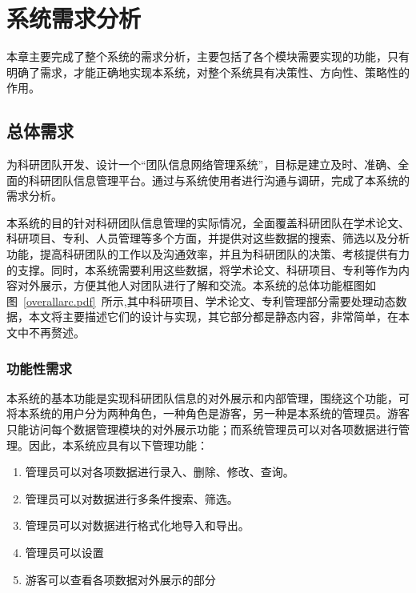 \chapter{系统需求分析}

本章主要完成了整个系统的需求分析，主要包括了各个模块需要实现的功能，只有明确了需求，才能正确地实现本系统，对整个系统具有决策性、方向性、策略性的作用。

\section{总体需求}
为科研团队开发、设计一个“团队信息网络管理系统”，目标是建立及时、准确、全面的科研团队信息管理平台。通过与系统使用者进行沟通与调研，完成了本系统的需求分析。

本系统的目的针对科研团队信息管理的实际情况，全面覆盖科研团队在学术论文、科研项目、专利、人员管理等多个方面，并提供对这些数据的搜索、筛选以及分析功能，提高科研团队的工作以及沟通效率，并且为科研团队的决策、考核提供有力的支撑。同时，本系统需要利用这些数据，将学术论文、科研项目、专利等作为内容对外展示，方便其他人对团队进行了解和交流。本系统的总体功能框图如图~\ref{overallarc.pdf}~所示,其中科研项目、学术论文、专利管理部分需要处理动态数据，本文将主要描述它们的设计与实现，其它部分都是静态内容，非常简单，在本文中不再赘述。


\subsection{功能性需求}

本系统的基本功能是实现科研团队信息的对外展示和内部管理，围绕这个功能，可将本系统的用户分为两种角色，一种角色是游客，另一种是本系统的管理员。游客只能访问每个数据管理模块的对外展示功能；而系统管理员可以对各项数据进行管理。因此，本系统应具有以下管理功能：


\begin{enumerate}
\item 管理员可以对各项数据进行录入、删除、修改、查询。
\item 管理员可以对数据进行多条件搜索、筛选。
\item 管理员可以对数据进行格式化地导入和导出。
\item 管理员可以设置
\item 游客可以查看各项数据对外展示的部分
\end{enumerate}

